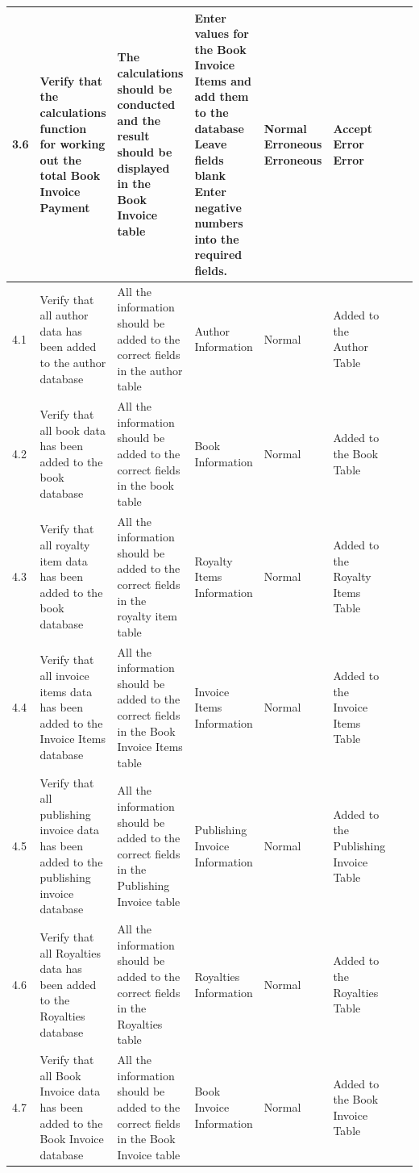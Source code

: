 \begin{landscape}
\begin{center}
\begin{longtable}{|p{1.5cm}|p{2cm}|p{2.5cm}|p{2.5cm}|p{2cm}|p{2cm}|p{2cm}|p{2cm}|}
\rowcolor{lightgray} 3.6 & Verify that the calculations function for working out the total Book Invoice Payment & The calculations should be conducted and the result should be displayed in the Book Invoice table & Enter values for the Book Invoice Items and add them to the database \newline Leave fields blank \newline Enter negative numbers into the required fields. & Normal \newline Erroneous \newline Erroneous & Accept \newline Error \newline Error & & \\ \hline 
        4.1 & Verify that all author data has been added to the author database & All the information should be added to the correct fields in the author table & Author Information & Normal & Added to the Author Table & & \\ \hline
        4.2 & Verify that all book data has been added to the book database & All the information should be added to the correct fields in the book table & Book Information & Normal & Added to the Book Table & & \\ \hline
        4.3 & Verify that all royalty item data has been added to the book database & All the information should be added to the correct fields in the royalty item table & Royalty Items Information & Normal & Added to the Royalty Items Table & & \\ \hline
        4.4 & Verify that all invoice items data has been added to the Invoice Items database & All the information should be added to the correct fields in the Book Invoice Items table & Invoice Items Information & Normal & Added to the Invoice Items Table & & \\ \hline
        4.5 & Verify that all publishing invoice data has been added to the publishing invoice database & All the information should be added to the correct fields in the Publishing Invoice table & Publishing Invoice Information & Normal & Added to the Publishing Invoice Table & & \\ \hline
        4.6 & Verify that all Royalties data has been added to the Royalties database & All the information should be added to the correct fields in the Royalties table & Royalties Information & Normal & Added to the Royalties Table & & \\ \hline
        4.7 & Verify that all Book Invoice data has been added to the Book Invoice database & All the information should be added to the correct fields in the Book Invoice table & Book Invoice Information & Normal & Added to the Book Invoice Table & & \\ \hline

\end{longtable}
\end{center}
\end{landscape}

